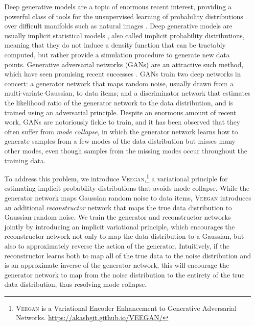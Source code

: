 \documentclass{article}
\newcommand{\acronym}{\textsc{Veegan}\xspace}
\begin{document}
Deep generative models are a topic of enormous recent interest, providing a powerful class of tools for the unsupervised learning of probability distributions
over difficult manifolds such as natural images \cite{kingma2013auto,rezende2014stochastic,gan}. Deep generative models are usually 
implicit statistical models \citep{diggle:gratton}, also called implicit probability distributions, meaning that
they do not induce a density function that can be tractably computed,
but rather provide a simulation procedure to generate new data points.
Generative adversarial networks (GANs) \cite{gan} are an attractive such method,
which have seen promising recent successes \cite{radford2015unsupervised,CycleGAN2017,sonderby2016amortised}.
GANs train two deep networks in concert: a generator network  that
maps random noise, usually drawn from a multi-variate Gaussian, to data items; and a discriminator network that
estimates the likelihood ratio of the generator network to the data distribution,
and is trained using an adversarial principle.
Despite an enormous amount of recent work, 
GANs are notoriously fickle to train, and it has been observed \cite{salimans16improved,Che2017ModeRG}
that they often suffer from  \emph{mode collapse}, in which the generator
network learns how to generate samples
from a few modes of the data distribution but misses
many other modes, even though samples from
the missing modes occur throughout  the training data.

To address this problem, we introduce \acronym,\footnote{\acronym is a Variational Encoder Enhancement
to Generative Adversarial Networks. \url{https://akashgit.github.io/VEEGAN/}} a variational principle for estimating
implicit probability distributions that avoids mode collapse. While the generator network
maps Gaussian random noise to data items, \acronym introduces an additional \emph{reconstructor} network that
maps the true data distribution to Gaussian random noise.
We train the generator and reconstructor networks jointly by
introducing an implicit variational principle, 
which encourages the reconstructor network
not only to map the data distribution to a Gaussian, but also to approximately reverse
the action of the generator.
Intuitively, if the reconstructor learns
both to map all of the true data to the noise distribution and is an approximate inverse of the generator network, this will encourage
the generator network to map from the noise distribution to the entirety of the true data distribution, thus resolving mode collapse. 
\end{document}
